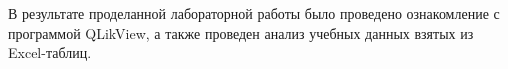 \Conclusion %

В результате проделанной лабораторной работы было проведено ознакомление
с программой QLikView, а также проведен анализ учебных данных взятых из
Excel-таблиц.

